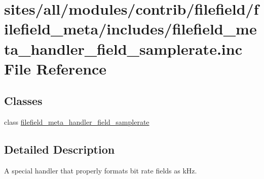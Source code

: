 \hypertarget{filefield__meta__handler__field__samplerate_8inc}{
\section{sites/all/modules/contrib/filefield/filefield\_\-meta/includes/filefield\_\-meta\_\-handler\_\-field\_\-samplerate.inc File Reference}
\label{filefield__meta__handler__field__samplerate_8inc}
}
\subsection*{Classes}
\begin{CompactItemize}
\item 
class \hyperlink{classfilefield__meta__handler__field__samplerate}{filefield\_\-meta\_\-handler\_\-field\_\-samplerate}
\end{CompactItemize}


\subsection{Detailed Description}
A special handler that properly formats bit rate fields as kHz. 